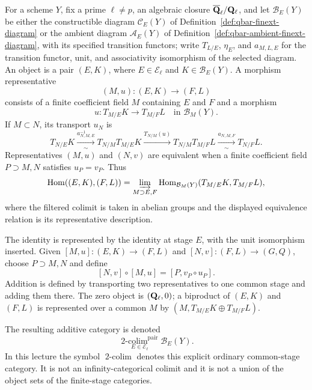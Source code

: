 \begin{definition}
\label{def:filtered-two-colimit}


For a scheme \(Y\), fix a prime \(\ell\neq p\), an algebraic closure
\(\overline{\mathbf Q}_\ell/\mathbf Q_{\ell}\), and let \(\mathcal B_E(Y)\) be either the constructible
diagram \(\mathcal C_E(Y)\) of Definition~\ref{def:qbar-finext-diagram} or
the ambient diagram \(\mathcal A_E(Y)\) of
Definition~\ref{def:qbar-ambient-finext-diagram}, with its specified
transition functors; write \(T_{L/E}\), \(\eta_E\), and \(a_{M,L,E}\) for
the transition functor, unit, and associativity isomorphism of the selected
diagram.  An object is a pair \((E,K)\), where
\(E\in\mathcal E_\ell\) and \(K\in\mathcal B_E(Y)\).  A morphism representative
\[
 (M,u):(E,K)\longrightarrow(F,L)
\]
consists of a finite coefficient field \(M\) containing \(E\) and \(F\)
and a morphism
\[
 u:T_{M/E}K\longrightarrow T_{M/F}L
 \quad\text{in }\mathcal B_M(Y).
\]
If \(M\subset N\), its transport \(u_N\) is
\[
 T_{N/E}K\xrightarrow[\sim]{a^{-1}_{N,M,E}}
 T_{N/M}T_{M/E}K\xrightarrow{T_{N/M}(u)}
 T_{N/M}T_{M/F}L\xrightarrow[\sim]{a_{N,M,F}}T_{N/F}L.
\]
Representatives \((M,u)\) and \((N,v)\) are equivalent when a finite
coefficient field \(P\supset M,N\) satisfies \(u_P=v_P\).  Thus
\[
 \operatorname{Hom}((E,K),(F,L))=
 \varinjlim_{M\supset E,F}
 \operatorname{Hom}_{\mathcal B_M(Y)}(T_{M/E}K,T_{M/F}L),
\]
where the filtered colimit is taken in abelian groups and the displayed
equivalence relation is its representative description.

The identity is represented by the identity at stage \(E\), with the unit
isomorphism inserted.  Given \([M,u]:(E,K)\to(F,L)\) and
\([N,v]:(F,L)\to(G,Q)\), choose \(P\supset M,N\) and define
\[
 [N,v]\circ[M,u]=[P,v_P\circ u_P].
\]
Addition is defined by transporting two representatives to one common
stage and adding them there.  The zero object is \((\mathbf Q_{\ell},0)\); a biproduct of
\((E,K)\) and \((F,L)\) is represented over a common \(M\) by
\((M,T_{M/E}K\oplus T_{M/F}L)\).

The resulting additive category is denoted
\[
 \underset{E\in\mathcal E_\ell}{\operatorname{2-colim}^{\mathrm{pair}}}
 \mathcal B_E(Y).
\]
In this lecture the symbol \(\operatorname{2-colim}\) denotes this explicit
ordinary common-stage category.  It is not an infinity-categorical colimit
and it is not a union of the object sets of the finite-stage categories.
\end{definition}

